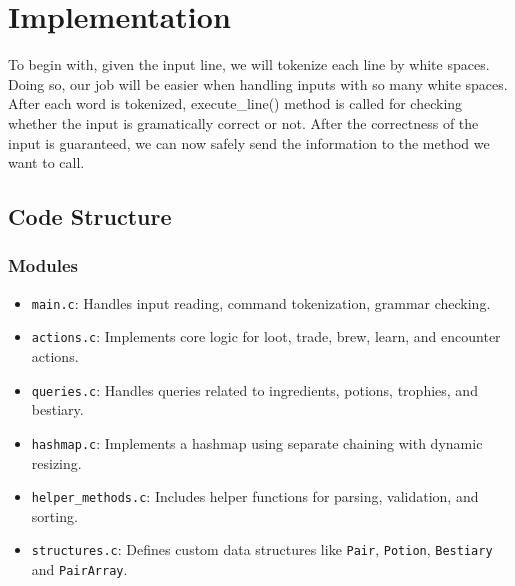 \documentclass[a4paper,12pt]{article}
\begin{document}
\section{Implementation}
To begin with, given the input line, we will tokenize each line by white spaces. Doing so, our job will be easier when handling inputs with so many white spaces. After each word is tokenized, execute\_line() method is called for checking whether the input is gramatically correct or not.\newline
After the correctness of the input is guaranteed, we can now safely send the information to the method we want to call.

\subsection{Code Structure}
\subsubsection{Modules}
\begin{itemize}
  \item \texttt{main.c}: Handles input reading, command tokenization, grammar checking.
  \item \texttt{actions.c}: Implements core logic for loot, trade, brew, learn, and encounter actions.
  \item \texttt{queries.c}: Handles queries related to ingredients, potions, trophies, and bestiary.
  \item \texttt{hashmap.c}: Implements a hashmap using separate chaining with dynamic resizing.
  \item \texttt{helper\_methods.c}: Includes helper functions for parsing, validation, and sorting.
  \item \texttt{structures.c}: Defines custom data structures like \texttt{Pair}, \texttt{Potion}, \texttt{Bestiary} and \texttt{PairArray}.
\end{itemize}
\end{document}
